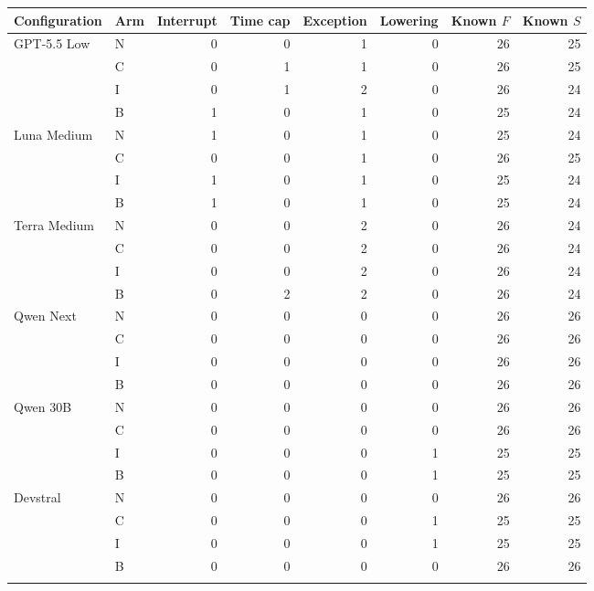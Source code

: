 \begin{tabular}{llrrrrrr}
\toprule
Configuration & Arm & Interrupt & Time cap & Exception & Lowering & Known $F$ & Known $S$\\
\midrule
GPT-5.5 Low & N & 0 & 0 & 1 & 0 & 26 & 25\\
 & C & 0 & 1 & 1 & 0 & 26 & 25\\
 & I & 0 & 1 & 2 & 0 & 26 & 24\\
 & B & 1 & 0 & 1 & 0 & 25 & 24\\
\addlinespace
Luna Medium & N & 1 & 0 & 1 & 0 & 25 & 24\\
 & C & 0 & 0 & 1 & 0 & 26 & 25\\
 & I & 1 & 0 & 1 & 0 & 25 & 24\\
 & B & 1 & 0 & 1 & 0 & 25 & 24\\
\addlinespace
Terra Medium & N & 0 & 0 & 2 & 0 & 26 & 24\\
 & C & 0 & 0 & 2 & 0 & 26 & 24\\
 & I & 0 & 0 & 2 & 0 & 26 & 24\\
 & B & 0 & 2 & 2 & 0 & 26 & 24\\
\addlinespace
Qwen Next & N & 0 & 0 & 0 & 0 & 26 & 26\\
 & C & 0 & 0 & 0 & 0 & 26 & 26\\
 & I & 0 & 0 & 0 & 0 & 26 & 26\\
 & B & 0 & 0 & 0 & 0 & 26 & 26\\
\addlinespace
Qwen 30B & N & 0 & 0 & 0 & 0 & 26 & 26\\
 & C & 0 & 0 & 0 & 0 & 26 & 26\\
 & I & 0 & 0 & 0 & 1 & 25 & 25\\
 & B & 0 & 0 & 0 & 1 & 25 & 25\\
\addlinespace
Devstral & N & 0 & 0 & 0 & 0 & 26 & 26\\
 & C & 0 & 0 & 0 & 1 & 25 & 25\\
 & I & 0 & 0 & 0 & 1 & 25 & 25\\
 & B & 0 & 0 & 0 & 0 & 26 & 26\\
\addlinespace
\bottomrule
\end{tabular}
